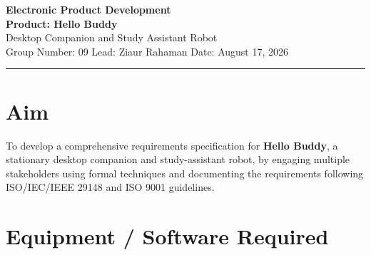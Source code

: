 \documentclass[12pt,a4paper]{article}
\begin{document}
\begin{center}
    {\Large\bfseries Electronic Product Development}\\[0.6cm]
    {\large\bfseries Product: Hello Buddy}\\[0.15cm]
    {\large Desktop Companion and Study Assistant Robot}\\[0.5cm]
    {\normalsize Group Number: 09 \qquad Lead: Ziaur Rahaman \qquad Date: August 17, 2026}
\end{center}

\vspace{0.3cm}
\hrule
\vspace{0.4cm}

\section*{Aim}

To develop a comprehensive requirements specification for \textbf{Hello Buddy}, a stationary
desktop companion and study-assistant robot, by engaging multiple stakeholders using formal
techniques and documenting the requirements following ISO/IEC/IEEE 29148 and ISO 9001
guidelines.

\section*{Equipment / Software Required}
\end{document}
